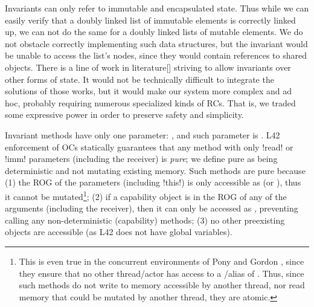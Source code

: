 Invariants can only refer to immutable and encapsulated state. Thus while we can easily verify that a doubly linked list of immutable elements
is correctly linked up,
we can not do the same for a doubly linked lists of mutable elements. We do not obstacle correctly implementing such data structures, but the invariant would be unable to access the list's nodes, since they would contain \Q@mut@ references to shared objects.
There is a line of work in literature[] striving to allow invariants over other forms of state.
It would not be technically difficult to 
integrate the solutions of those works, but 
it would make our system more complex and ad hoc, probably requiring numerous specialized kinds of RCs.
That is, we traded some expressive power in order to preserve safety and simplicity.


\label{s:purity}
Invariant methods have only one parameter: \Q@this@, and such parameter is \Q@read@.
L42 enforcement of OCs statically guarantees that any method with only \Q!read! or \Q!imm! parameters (including the receiver) is \emph{pure}; we define pure
as being deterministic and not mutating existing memory. Such methods are pure because
(1) the ROG of the parameters (including \Q!this!) is only accessible as \Q@read@ (or \Q@imm@), thus it cannot be mutated\footnote{This is even true in the concurrent environments of Pony and Gordon \etal, since they ensure that no other thread/actor has access to a \Q@mut@/\Q@capsule@ alias of \Q@this@. 
	Thus, since such methods do not write to memory accessible by another thread, nor read memory that could be mutated by another thread, they are atomic.};
(2) if a capability object is in the ROG of any of the arguments (including the receiver), then it can only be accessed as \Q@read@, preventing calling any 
non-deterministic (capability) methods;
(3) no other preexisting objects are accessible (as L42 does not have global variables). 



